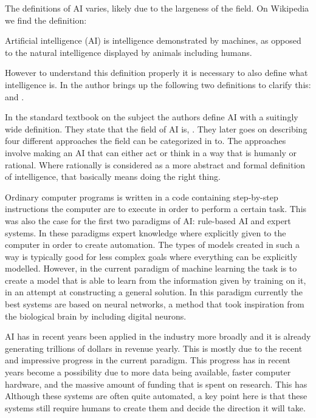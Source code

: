 \documentclass[12pt,A4]{report}
\theoremstyle{definition}
\begin{document}
The definitions of AI varies, likely due to the largeness of the field. On Wikipedia we find the definition\autocite{Wikipedia}:
\begin{displayquote}
Artificial intelligence (AI) is intelligence demonstrated by machines, as opposed to the natural intelligence displayed by animals including humans.
\end{displayquote}
However to understand this definition properly it is necessary to also define what intelligence is. In \autocite{Tänkande Maskiner} the author brings up the following two definitions to clarify this:  and . 

In the standard textbook on the subject \autocite{Russel Norving} the authors define AI with a suitingly wide definition. They state that the field of AI is, . They later goes on describing four different approaches the field can be categorized in to. The approaches involve making an AI that can either act or think in a way that is humanly or rational. Where rationally is considered as a more abstract and formal definition of intelligence, that basically means doing the right thing. 

Ordinary computer programs is written in a code containing step-by-step instructions the computer are to execute in order to perform a certain task. This was also the case for the first two paradigms of AI: rule-based AI and expert systems\autocite{K'lla}. In these paradigms expert knowledge where explicitly given to the computer in order to create automation. The types of models created in such a way is typically good for less complex goals where everything can be explicitly modelled. However, in the current paradigm of machine learning the task is to create a model that is able to learn from the information given by training on it, in an attempt at constructing a general solution\autocite{K'lla}. In this paradigm currently the best systems are based on neural networks, a method that took inspiration from the biological brain by including digital neurons. 

AI has in recent years been applied in the industry more broadly and it is already generating trillions of dollars in revenue yearly\autocite{Russel Norving}. This is mostly due to the recent and impressive progress in the current paradigm. This progress has in recent years become a possibility due to more data being available, faster computer hardware, and the massive amount of funding that is spent on research. This has Although these systems are often quite automated, a key point here is that these systems still require humans to create them and decide the direction it will take.
\end{document}
